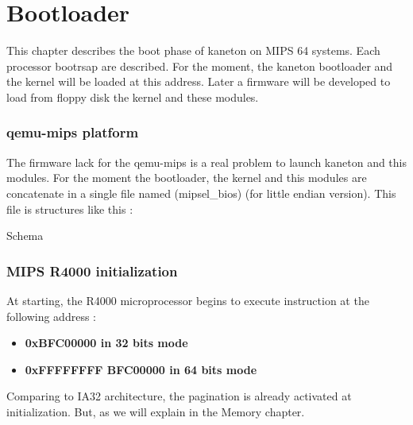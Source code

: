 %
%
%
%
%
%

%
%

\chapter{Bootloader}

This chapter describes the boot phase of kaneton on MIPS 64 systems. Each processor bootrsap are described. For the moment, the kaneton bootloader and the kernel will be loaded at this address. Later a firmware will be developed to load from floppy disk the kernel and these modules.

\subsection{qemu-mips platform}

The firmware lack for the qemu-mips is a real problem to launch kaneton and this modules.
For the moment the bootloader, the kernel and this modules are concatenate in a single file
named \location(mipsel\_bios) (for little endian version). This file is structures like this :

Schema

\subsection{MIPS R4000 initialization}

At starting, the R4000 microprocessor begins to execute instruction at the following address :

\begin{itemize}
  \item
    \textbf{0xBFC00000 in 32 bits mode}
  \item
    \textbf{0xFFFFFFFF BFC00000 in 64 bits mode}
\end{itemize}

Comparing to IA32 architecture, the pagination is already activated at initialization. But, as we will explain in the Memory chapter.
